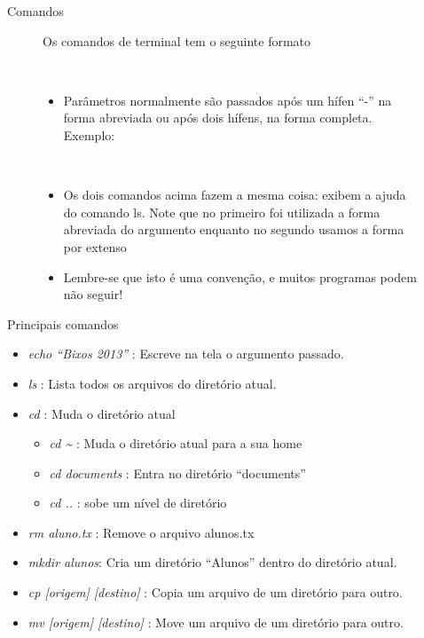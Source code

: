 \documentclass{beamer}
\begin{document}
\begin{frame}{Comandos}
    \begin{figure}[h]
        \centering
        Os comandos de terminal tem o seguinte formato \newline \\
        \begin{shell}
        \end{shell}
        \\
        \begin{itemize}
        \item Parâmetros normalmente são passados após um hífen ``-'' na forma
          abreviada ou após dois hífens, na forma completa. Exemplo:
        \end{itemize}
        \begin{shell}
        \end{shell}
        \\
        \begin{itemize}
        \item{ Os dois comandos acima fazem a mesma coisa: exibem a ajuda
          do comando ls. Note que no primeiro foi utilizada a forma abreviada
          do argumento enquanto no segundo usamos a forma por extenso}
        \item{ Lembre-se que isto é uma convenção, e muitos programas podem não
          seguir!}
        \end{itemize}
    \end{figure}
\end{frame}

\begin{frame}{Principais comandos}
   \begin{itemize}
   \item \emph{echo ``Bixos 2013''} : Escreve na tela o argumento passado.
   \item \emph{ls} : Lista todos os arquivos do diretório atual.
   \item \emph{cd} : Muda o diretório atual
     \begin{itemize}
     \item \emph{cd \~{}} : Muda o diretório atual para a sua home
     \item \emph{cd documents} : Entra no diretório ``documents''
     \item \emph{cd ..} : sobe um nível de diretório
     \end{itemize}
   \item \emph{rm aluno.tx} : Remove o arquivo alunos.tx
   \item \emph{mkdir alunos}: Cria um diretório ``Alunos'' dentro do
     diretório atual.
   \item \emph{cp [origem] [destino]} : Copia um arquivo de um diretório para
     outro.
   \item \emph{mv [origem] [destino]} : Move um arquivo de um diretório para
     outro.
       

   \end{itemize}
\end{frame}
\end{document}
